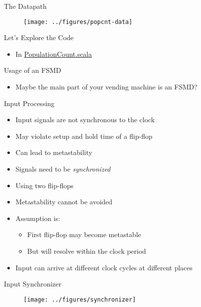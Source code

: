 \begin{frame}[fragile]{The Datapath}
\begin{figure}
  \texttt{[image: ../figures/popcnt-data]}
\end{figure}
\end{frame}

\begin{frame}[fragile]{Let's Explore the Code}
\begin{itemize}
\item In \href{https://github.com/schoeberl/chisel-book/blob/master/src/main/scala/PopulationCount.scala}{PopulationCount.scala}
\end{itemize}
\end{frame}

\begin{frame}[fragile]{Usage of an FSMD}
\begin{itemize}
\item Maybe the main part of your vending machine is an FSMD?
\end{itemize}
\end{frame}

\begin{frame}[fragile]{Input Processing}
\begin{itemize}
\item Input signals are not synchronous to the clock
\item May violate setup and hold time of a flip-flop
\item Can lead to metastability
\item Signals need to be \emph{synchronized}
\item Using two flip-flops
\item Metastability cannot be avoided
\item Assumption is:
\begin{itemize}
\item First flip-flop may become metastable
\item But will resolve within the clock period
\end{itemize}
\item Input can arrive at different clock cycles at different places
\end{itemize}
\end{frame}

\begin{frame}[fragile]{Input Synchronizer}
\begin{figure}
  \texttt{[image: ../figures/synchronizer]}
\end{figure}
\end{frame}

